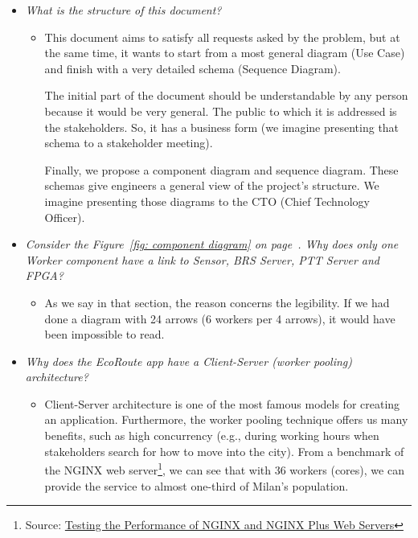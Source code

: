 \documentclass[a4paper]{article}
\begin{document}
    \begin{itemize}[label=]
        \item \emph{What is the structure of this document?}
        \begin{itemize}[label=]
            \item This document aims to satisfy all requests asked by the problem, but at the same time, it wants to start from a most general diagram (Use Case) and finish with a very detailed schema (Sequence Diagram). 

            The initial part of the document should be understandable by any person because it would be very general. The public to which it is addressed is the stakeholders. So, it has a business form (we imagine presenting that schema to a stakeholder meeting).
            
            Finally, we propose a component diagram and sequence diagram. These schemas give engineers a general view of the project's structure. We imagine presenting those diagrams to the CTO (Chief Technology Officer).
        \end{itemize}
        
        \item \emph{Consider the Figure~\ref{fig: component diagram} on page~\pageref{fig: component diagram}. Why does only one Worker component have a link to Sensor, BRS Server, PTT Server and FPGA?}
        \begin{itemize}[label=]
            \item As we say in that section, the reason concerns the legibility. If we had done a diagram with 24 arrows (6 workers per 4 arrows), it would have been impossible to read.
        \end{itemize}

        \item \emph{Why does the EcoRoute app have a Client-Server (worker pooling) architecture?}
        \begin{itemize}[label=]
            \item Client-Server architecture is one of the most famous models for creating an application. Furthermore, the worker pooling technique offers us many benefits, such as high concurrency (e.g., during working hours when stakeholders search for how to move into the city). From a benchmark of the NGINX web server\footnote{Source: \href{https://www.nginx.com/blog/testing-the-performance-of-nginx-and-nginx-plus-web-servers/}{Testing the Performance of NGINX and NGINX Plus Web Servers}}, we can see that with 36 workers (cores), we can provide the service to almost one-third of Milan's population.
        \end{itemize}


\end{itemize}
\end{document}
